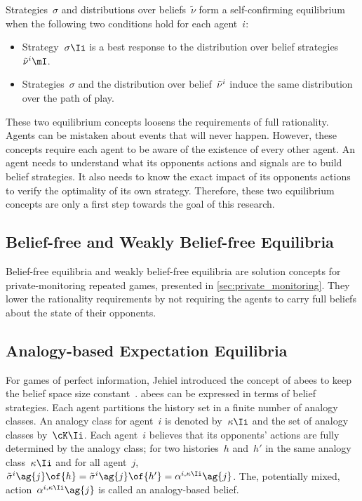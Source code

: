 Strategies~\(\sigma\) and distributions over beliefs~\(\tilde{\nu}\) form a self-confirming equilibrium when the following two conditions hold for each agent~\(i\):
\begin{itemize}
\item Strategy~\(\sigma\Ii\) is a best response to the distribution over belief strategies~\(\tilde{\nu}\belief{i}\mI\).
\item Strategies~\(\sigma\) and the distribution over belief~\(\tilde{\nu}^{i}\) induce the same distribution over the path of play.
\end{itemize}

These two equilibrium concepts loosens the requirements of full rationality.
Agents can be mistaken about events that will never happen.
However, these concepts require each agent to be aware of the existence of every other agent.
An agent needs to understand what its opponents actions and signals are to build belief strategies.
It also needs to know the exact impact of its opponents actions to verify the optimality of its own strategy.
Therefore, these two equilibrium concepts are only a first step towards the goal of this research.

\subsection{Belief-free and Weakly Belief-free Equilibria}
Belief-free equilibria and weakly belief-free equilibria are solution concepts for private-monitoring repeated games, presented in \cref{sec:private_monitoring}.
They lower the rationality requirements by not requiring the agents to carry full beliefs about the state of their opponents.

\subsection{Analogy-based Expectation Equilibria}
For games of perfect information, Jehiel introduced the concept of \acp{abee} to keep the belief space size constant~\cite{jehiel:2005}.
\acp{abee} can be expressed in terms of belief strategies.
Each agent partitions the history set in a finite number of analogy classes.
An analogy class for agent~\(i\) is denoted by~\(\kappa\Ii\) and the set of analogy classes by~\(\cK\Ii\).
Each agent~\(i\) believes that its opponents' actions are fully determined by the analogy class; for two histories~\(h\) and~\(h'\) in the same analogy class~\(\kappa\Ii\) and for all agent~\(j\), \(\tilde{\sigma}\belief{i}\ag{j} \of{h} = \tilde{\sigma}\belief{i}\ag{j} \of{h'} = \alpha\belief{i,\kappa\Ii}\ag{j}\).
The, potentially mixed, action~\(\alpha\belief{i, \kappa\Ii}\ag{j}\) is called an analogy-based belief.

